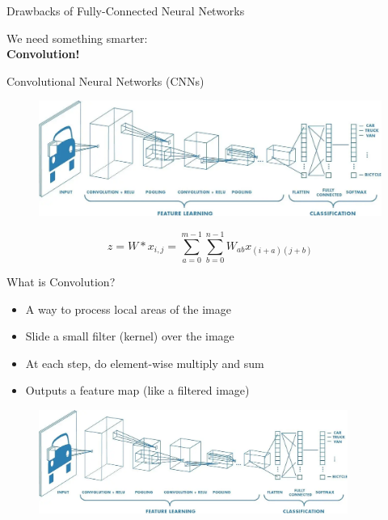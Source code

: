 \begin{frame}[allowframebreaks]{Drawbacks of Fully-Connected Neural Networks}
\end{frame}

\begin{frame}
    \begin{center}
        We need something smarter: \\
        \LARGE \textbf{Convolution!}
    \end{center}
\end{frame}

\begin{frame}{Convolutional Neural Networks (CNNs)}
    \begin{figure}
        \centering
        \includegraphics[width=1.0\textwidth,height=0.9\textheight,keepaspectratio]{images/cnn/cnn-architecture.png}
    \end{figure}

$$z = W * x_{i,j} = \sum_{a=0}^{m-1}\sum_{b=0}^{n-1} W_{ab}x_{(i+a)(j+b)}$$

\end{frame}

\begin{frame}[allowframebreaks]{What is Convolution?}
    \begin{itemize}
        \item A way to process local areas of the image
        \item Slide a small filter (kernel) over the image
        \item At each step, do element-wise multiply and sum
        \item Outputs a feature map (like a filtered image)
    \end{itemize}
    \begin{figure}
        \centering
        \includegraphics[width=0.9\textwidth,keepaspectratio]{images/cnn/cnn-architecture.png}
    \end{figure}
\end{frame}